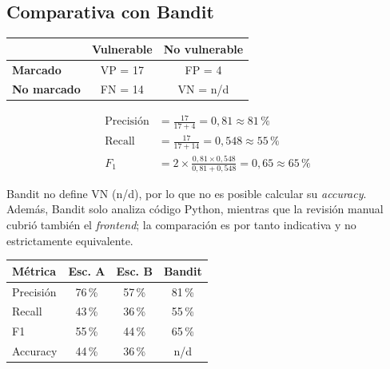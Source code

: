\documentclass[11pt,letterpaper]{article}
\newcommand{\enc}[1]{\textbf{#1}}
\begin{document}
\subsection{Comparativa con Bandit}

\begin{center}
\begin{tabular}{lcc}
\toprule
 & \enc{Vulnerable} & \enc{No vulnerable} \\
\midrule
\enc{Marcado} & VP = 17 & FP = 4 \\
\enc{No marcado} & FN = 14 & VN = n/d \\
\bottomrule
\end{tabular}
\end{center}

\begin{align*}
\text{Precisión} &= \frac{17}{17+4}=0{,}81\approx 81\,\% \\
\text{Recall} &= \frac{17}{17+14}=0{,}548\approx 55\,\% \\
F_1 &= 2\times\frac{0{,}81\times 0{,}548}{0{,}81+0{,}548}=0{,}65\approx 65\,\%
\end{align*}

Bandit no define VN (n/d), por lo que no es posible calcular su \textit{accuracy}. Además, Bandit solo analiza código Python, mientras que la revisión manual cubrió también el \textit{frontend}; la comparación es por tanto indicativa y no estrictamente equivalente.

\begin{center}
\begin{tabular}{lccc}
\toprule
\enc{Métrica} & \enc{Esc. A} & \enc{Esc. B} & \enc{Bandit} \\
\midrule
Precisión & 76\,\% & 57\,\% & 81\,\% \\
Recall & 43\,\% & 36\,\% & 55\,\% \\
F1 & 55\,\% & 44\,\% & 65\,\% \\
Accuracy & 44\,\% & 36\,\% & n/d \\
\bottomrule
\end{tabular}
\end{center}
\end{document}
